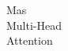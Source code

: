 \documentclass[preview]{standalone}
\begin{document}
\begin{center}
Mas\\ Multi-Head\\ Attention
\end{center}
\end{document}
